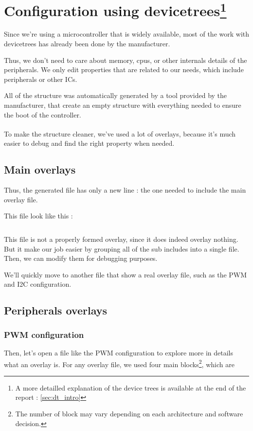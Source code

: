\section[Configuration using devicetrees]{Configuration using devicetrees\footnote{
      A more detailled explanation of the device trees is available at the end of the report : \ref{sec:dt_intro}
  }}
Since we're using a microcontroller that is widely available, most of the work with
devicetrees has already been done by the manufacturer.

Thus, we don't need to care about memory, cpus, or other internals details of the
peripherals. We only edit properties that are related to our needs, which include
peripherals or other ICs.

All of the structure was automatically generated by a tool provided by the manufacturer,
that create an empty structure with everything needed to ensure the boot of the controller.

\paragraph{}
To make the structure cleaner, we've used a lot of overlays, because it's much easier
to debug and find the right property when needed.

\subsection{Main overlays}
Thus, the generated file has only a new line : the one needed to include the main overlay file.

This file look like this :

\inputminted[linenos, firstline=16, lastline=44]{devicetree}{\DeviceTree/topaze-pinctrl.dtsi}

This file is not a properly formed overlay, since it does indeed overlay nothing. But it make our
job easier by grouping all of the sub includes into a single file. Then, we can modify them for
debugging purposes.

We'll quickly move to another file that show a real overlay file, such as the PWM and I2C configuration.

\subsection{Peripherals overlays}
\subsubsection{PWM configuration}
Then, let's open a file like the PWM configuration to explore more in details what an overlay is.
For any overlay file, we used four main blocks\footnote{
    The number of block may vary depending on each architecture and software decision.
}, which are

